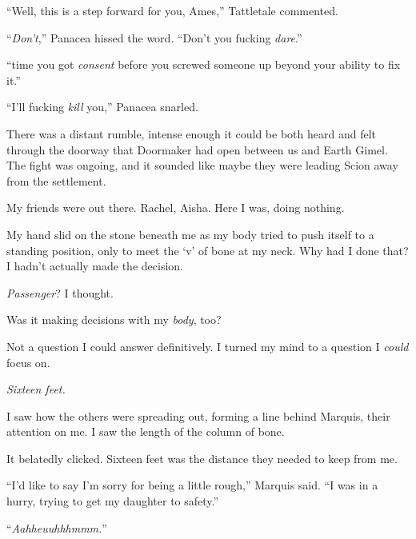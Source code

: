 ``Well, this is a step forward for you, Ames,'' Tattletale commented.



``\emph{Don't},'' Panacea hissed the word.  ``Don't you fucking \emph{dare}.''



``\ldotsThis time you got \emph{consent} before you screwed someone up beyond your ability to fix it.''



``I'll fucking \emph{kill} you,'' Panacea snarled.



There was a distant rumble, intense enough it could be both heard and felt through the doorway that Doormaker had open between us and Earth Gimel.  The fight was ongoing, and it sounded like maybe they were leading Scion away from the settlement.



My friends were out there.  Rachel, Aisha.  Here I was, doing nothing.



My hand slid on the stone beneath me as my body tried to push itself to a standing position, only to meet the `v' of bone at my neck.  Why had I done that?  I hadn't actually made the decision.



\emph{Passenger}?  I thought.



Was it making decisions with my \emph{body}, too?



Not a question I could answer definitively.  I turned my mind to a question I \emph{could} focus on.



\emph{Sixteen feet. }



I saw how the others were spreading out, forming a line behind Marquis, their attention on me.  I saw the length of the column of bone.



It belatedly clicked.  Sixteen feet was the distance they needed to keep from me.



``I'd like to say I'm sorry for being a little rough,'' Marquis said.  ``I was in a hurry, trying to get my daughter to safety.''



``\emph{Aahheuuhhhmmm.}''



